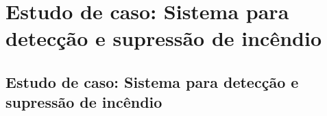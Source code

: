 \chapter{Estudo de caso: Sistema para detecção e supressão de incêndio}



\section{Estudo de caso: Sistema para detecção e supressão de incêndio}

